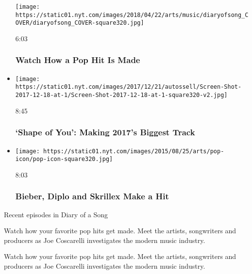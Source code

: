 \begin{itemize}
  \texttt{[image: https://static01.nyt.com/images/2018/04/22/arts/music/diaryofsong\_COVER/diaryofsong\_COVER-square320.jpg]}

  6:03

  \hypertarget{watch-how-a-pop-hit-is-made}{%
  \subsubsection{Watch How a Pop Hit Is
  Made}\label{watch-how-a-pop-hit-is-made}}
\item
  \href{https://www.nytimes.com/video/arts/music/100000005469604/ed-sheeran-shape-of-you.html?action=click\&module=video-series-bar\&region=header\&pgtype=Article\&playlistId=video/diaryofasong}{}

  \texttt{[image: https://static01.nyt.com/images/2017/12/21/autossell/Screen-Shot-2017-12-18-at-1/Screen-Shot-2017-12-18-at-1-square320-v2.jpg]}

  8:45

  \hypertarget{shape-of-you-making-2017s-biggest-track}{%
  \subsubsection{`Shape of You': Making 2017's Biggest
  Track}\label{shape-of-you-making-2017s-biggest-track}}
\item
  \href{https://www.nytimes.com/video/arts/music/100000003872410/bieber-diplo-and-skrillex-make-a-hit.html?action=click\&module=video-series-bar\&region=header\&pgtype=Article\&playlistId=video/diaryofasong}{}

  \texttt{[image: https://static01.nyt.com/images/2015/08/25/arts/pop-icon/pop-icon-square320.jpg]}

  8:03

  \hypertarget{bieber-diplo-and-skrillex-make-a-hit}{%
  \subsubsection{Bieber, Diplo and Skrillex Make a
  Hit}\label{bieber-diplo-and-skrillex-make-a-hit}}
\end{itemize}

Recent episodes in Diary of a Song

Watch how your favorite pop hits get made. Meet the artists, songwriters
and producers as Joe Coscarelli investigates the modern music industry.

Watch how your favorite pop hits get made. Meet the artists, songwriters
and producers as Joe Coscarelli investigates the modern music industry.

